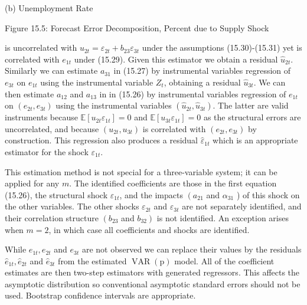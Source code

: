 \documentclass[10pt]{article}
\begin{document}
(b) Unemployment Rate

Figure 15.5: Forecast Error Decomposition, Percent due to Supply Shock

is uncorrelated with $u_{2 t}=\varepsilon_{2 t}+b_{23} \varepsilon_{3 t}$ under the assumptions (15.30)-(15.31) yet is correlated with $e_{1 t}$ under (15.29). Given this estimator we obtain a residual $\widehat{u}_{2 t}$. Similarly we can estimate $a_{31}$ in (15.27) by instrumental variables regression of $e_{3 t}$ on $e_{1 t}$ using the instrumental variable $Z_{t}$, obtaining a residual $\widehat{u}_{3 t}$. We can then estimate $a_{12}$ and $a_{13}$ in in (15.26) by instrumental variables regression of $e_{1 t}$ on $\left(e_{2 t}, e_{3 t}\right)$ using the instrumental variables $\left(\widehat{u}_{2 t}, \widehat{u}_{3 t}\right)$. The latter are valid instruments because $\mathbb{E}\left[u_{2 t} \varepsilon_{1 t}\right]=0$ and $\mathbb{E}\left[u_{3 t} \varepsilon_{1 t}\right]=0$ as the structural errors are uncorrelated, and because $\left(u_{2 t}, u_{3 t}\right)$ is correlated with $\left(e_{2 t}, e_{3 t}\right)$ by construction. This regression also produces a residual $\widehat{\varepsilon}_{1 t}$ which is an appropriate estimator for the shock $\varepsilon_{1 t}$.

This estimation method is not special for a three-variable system; it can be applied for any $m$. The identified coefficients are those in the first equation (15.26), the structural shock $\varepsilon_{1 t}$, and the impacts $\left(a_{21}\right.$ and $\alpha_{31}$ ) of this shock on the other variables. The other shocks $\varepsilon_{2 t}$ and $\varepsilon_{3 t}$ are not separately identified, and their correlation structure $\left(b_{23}\right.$ and $\left.b_{32}\right)$ is not identified. An exception arises when $m=2$, in which case all coefficients and shocks are identified.

While $e_{1 t}, e_{2 t}$ and $e_{3 t}$ are not observed we can replace their values by the residuals $\widehat{e}_{1 t}, \widehat{e}_{2 t}$ and $\widehat{e}_{3 t}$ from the estimated $\operatorname{VAR}(\mathrm{p})$ model. All of the coefficient estimates are then two-step estimators with generated regressors. This affects the asymptotic distribution so conventional asymptotic standard errors should not be used. Bootstrap confidence intervals are appropriate.
\end{document}
